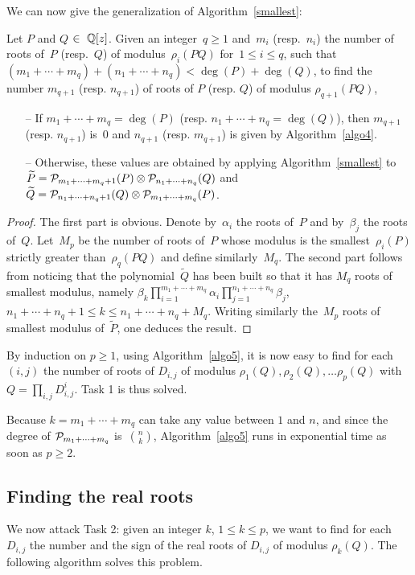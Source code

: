 \noindent We can now give the generalization of Algorithm~\ref{smallest}:
\begin{alg}\label{algo5}
Let $P$ and $Q$ $\in\ {\Bbb Q}[z]$. Given an integer~$q\ge1$ and~$m_i$
(resp.~$n_i$) the number of roots of~$P$ (resp.~$Q$) of
modulus~$\rho_i(PQ)$ for~$1\le i\le q$, such
that~$(m_1+\cdots+m_q)+(n_1+\cdots+n_q)<\deg(P)+\deg(Q)$, 
to find the number $m_{q+1}$ (resp. $n_{q+1}$) of
roots of $P$ (resp. $Q$) of modulus $\rho_{q+1}(PQ)$,
\begin{itemize}
\item[--] If $m_1+\cdots+m_q=\deg(P)$ (resp.
$n_1+\cdots+n_q=\deg(Q)$), then $m_{q+1}$ (resp. $n_{q+1}$) is~0 and
$n_{q+1}$ (resp. $m_{q+1}$) is
given by Algorithm~\ref{algo4}.
\item[--] Otherwise, these values are obtained by applying
Algorithm~\ref{smallest} to
$\widetilde{P}=
{\cal P}_{m_1+\cdots+m_q+1}(P)\otimes{\cal P}_{n_1+\cdots+n_q}(Q)$
and $\widetilde{Q}=
{\cal P}_{n_1+\cdots+n_q+1}(Q)\otimes{\cal P}_{m_1+\cdots+m_q}(P)$.
\end{itemize}
\end{alg}
\begin{proof}
The first part is obvious. Denote by~$\alpha_i$ the roots of~$P$ and
by~$\beta_j$ the roots of~$Q$. Let~$M_p$ be the number of roots of~$P$ whose
modulus is the smallest~$\rho_i(P)$ strictly greater than~$\rho_q(PQ)$
and define similarly~$M_q$. The second part follows from noticing that
the polynomial~$\widetilde{Q}$ has been built so that it has $M_q$ roots
of smallest modulus, namely
$\beta_k\prod_{i=1}^{m_1+\cdots+m_q}{\alpha_i}
\prod_{j=1}^{n_1+\cdots+n_q}{\beta_j}$,
$n_1+\cdots+n_q+1 \leq k \leq n_1+\cdots+n_q+M_q$. Writing similarly
the~$M_p$ roots of smallest modulus of~$\widetilde{P}$, one deduces the result.
\end{proof}

By induction on $p \geq 1$, using Algorithm~\ref{algo5}, it is now easy to
find for each~$(i,j)$ 
the number of roots of $D_{i,j}$ of modulus $\rho_1(Q), \rho_2(Q),
\ldots \rho_p(Q)$ with $Q=\prod_{i,j} D_{i,j}^i$. Task 1 is thus solved.

Because $k=m_1+\cdots+m_q$ can take any value between $1$ and
$n$, and since the degree of ${\cal P}_{m_1+\cdots+m_q}$ is~$n \choose k$,
 Algorithm~\ref{algo5} runs in exponential time as soon as
$p \geq 2$.
\subsection{Finding the real roots}
We now attack Task 2: given an integer $k$, $1 \leq k \leq p$,
we want to find for 
each $D_{i,j}$ the number and the sign of the real roots of $D_{i,j}$
of modulus $\rho_k(Q)$. The following algorithm solves this problem.

